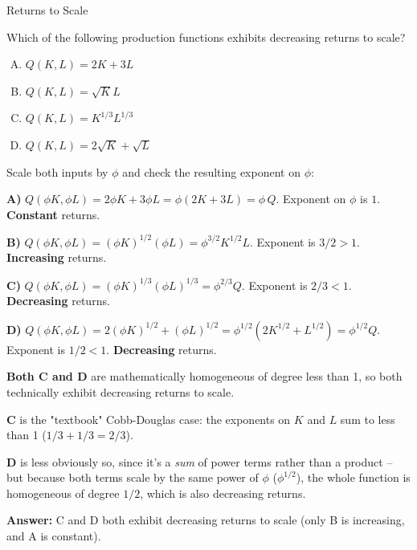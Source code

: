 \documentclass{beamer}
\begin{document}
\begin{frame}{Returns to Scale}

  \bigskip
  Which of the following production functions exhibits decreasing returns to scale?

  \bigskip
  \begin{enumerate}[A)]
    \item $Q(K,L) = 2K+3L$
    \item $Q(K,L) = \sqrt{K}L$
    \item $Q(K,L) = K^{1/3}L^{1/3}$
    \item $Q(K,L) = 2\sqrt{K} + \sqrt{L}$
  \end{enumerate}
\end{frame}

\begin{frame}

  \bigskip
  Scale both inputs by $\phi$ and check the resulting exponent on $\phi$:

  \bigskip
  \textbf{A)} $Q(\phi K,\phi L) = 2\phi K + 3\phi L = \phi(2K+3L) = \phi\,Q$. Exponent on $\phi$ is $1$. \textbf{Constant} returns.

  \bigskip
  \textbf{B)} $Q(\phi K,\phi L) = (\phi K)^{1/2}(\phi L) = \phi^{3/2}K^{1/2}L$. Exponent is $3/2 > 1$. \textbf{Increasing} returns.

  \bigskip
  \textbf{C)} $Q(\phi K,\phi L) = (\phi K)^{1/3}(\phi L)^{1/3} = \phi^{2/3}Q$. Exponent is $2/3 < 1$. \textbf{Decreasing} returns.

  \bigskip
  \textbf{D)} $Q(\phi K,\phi L) = 2(\phi K)^{1/2} + (\phi L)^{1/2} = \phi^{1/2}(2K^{1/2}+L^{1/2}) = \phi^{1/2}Q$. Exponent is $1/2 < 1$. \textbf{Decreasing} returns.
\end{frame}

\begin{frame}

  \bigskip
  \textbf{Both C and D} are mathematically homogeneous of degree less than 1, so both technically exhibit decreasing returns to scale.

  \bigskip
  \textbf{C} is the "textbook" Cobb-Douglas case: the exponents on $K$ and $L$ sum to less than 1 ($1/3+1/3 = 2/3$).

  \bigskip
  \textbf{D} is less obviously so, since it's a \emph{sum} of power terms rather than a product -- but because both terms scale by the same power of $\phi$ ($\phi^{1/2}$), the whole function is homogeneous of degree $1/2$, which is also decreasing returns.

  \bigskip
  \textbf{Answer:} C and D both exhibit decreasing returns to scale (only B is increasing, and A is constant).
\end{frame}
\end{document}
